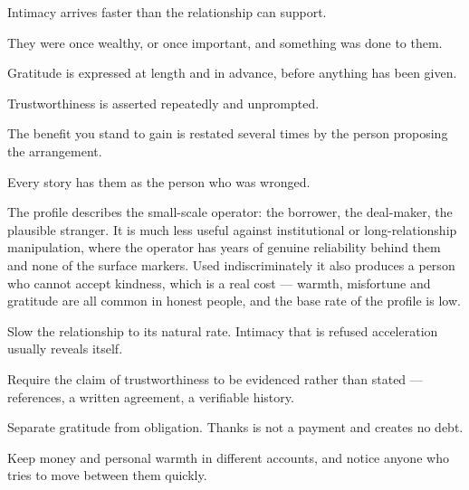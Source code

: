 \begin{feedback}
  \item Intimacy arrives faster than the relationship can support.
  \item They were once wealthy, or once important, and something was done to them.
  \item Gratitude is expressed at length and in advance, before anything has been given.
  \item Trustworthiness is asserted repeatedly and unprompted.
  \item The benefit you stand to gain is restated several times by the person proposing the arrangement.
  \item Every story has them as the person who was wronged.
\end{feedback}

\begin{failure}
The profile describes the small-scale operator: the borrower, the deal-maker, the plausible stranger. It is much less useful against institutional or long-relationship manipulation, where the operator has years of genuine reliability behind them and none of the surface markers. Used indiscriminately it also produces a person who cannot accept kindness, which is a real cost --- warmth, misfortune and gratitude are all common in honest people, and the base rate of the profile is low.
\end{failure}

\begin{countermeasures}
  \item Slow the relationship to its natural rate. Intimacy that is refused acceleration usually reveals itself.
  \item Require the claim of trustworthiness to be evidenced rather than stated --- references, a written agreement, a verifiable history.
  \item Separate gratitude from obligation. Thanks is not a payment and creates no debt.
  \item Keep money and personal warmth in different accounts, and notice anyone who tries to move between them quickly.
\end{countermeasures}

\seesources
{}
